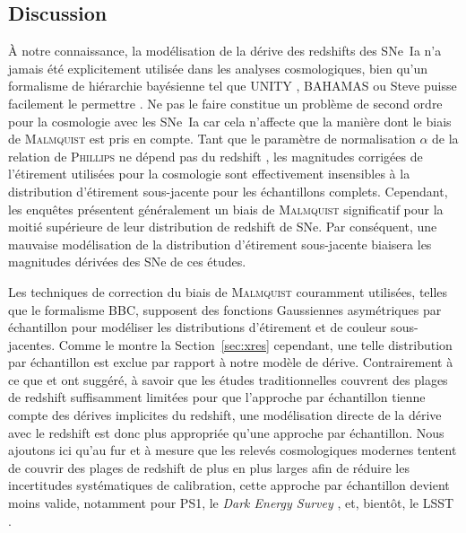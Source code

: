 \documentclass[../main/main.tex]{subfiles}
\begin{document}
\subsection{Discussion}\label{ssec:disc}

À notre connaissance, la modélisation de la dérive des redshifts des SNe~Ia n'a
jamais été explicitement utilisée dans les analyses cosmologiques, bien qu'un
formalisme de hiérarchie bayésienne tel que UNITY \citep{rubin2015}, BAHAMAS
\citep{shariff2016} ou Steve \citep{hinton2019} puisse facilement le permettre
\citep[voir, par exemple, les sections 1.3 et 2.5 de][]{rubin2015}. Ne pas le
faire constitue un problème de second ordre pour la cosmologie avec les SNe~Ia
car cela n'affecte que la manière dont le biais de \textsc{Malmquist} est pris
en compte. Tant que le paramètre de normalisation $\alpha$ de la relation de
\textsc{Phillips} \citep{phillips1993} ne dépend pas du redshift \citep[une
étude qui dépasse le cadre de cette thèse, mais voir, par
exemple][]{scolnic2018}, les magnitudes corrigées de l'étirement utilisées pour
la cosmologie sont effectivement insensibles à la distribution d'étirement
sous-jacente pour les échantillons complets. Cependant, les enquêtes présentent
généralement un biais de \textsc{Malmquist} significatif pour la moitié
supérieure de leur distribution de redshift de SNe. Par conséquent, une mauvaise
modélisation de la distribution d'étirement sous-jacente biaisera les magnitudes
dérivées des SNe de ces études.

Les techniques de correction du biais de \textsc{Malmquist} couramment
utilisées, telles que le formalisme BBC, supposent des fonctions Gaussiennes
asymétriques par échantillon pour modéliser les distributions d'étirement et de
couleur sous-jacentes. Comme le montre la Section~\ref{sec:xres} cependant, une
telle distribution par échantillon est exclue par rapport à notre modèle de
dérive. Contrairement à ce que \citep[Section 2]{scolnic2016} et \citep[Section
5.4]{scolnic2018} ont suggéré, à savoir que les études traditionnelles couvrent
des plages de redshift suffisamment limitées pour que l'approche par échantillon
tienne compte des dérives implicites du redshift, une modélisation directe de la
dérive avec le redshift est donc plus appropriée qu'une approche par
échantillon. Nous ajoutons ici qu'au fur et à mesure que les relevés
cosmologiques modernes tentent de couvrir des plages de redshift de plus en plus
larges afin de réduire les incertitudes systématiques de calibration, cette
approche par échantillon devient moins valide, notamment pour PS1, le
\textit{Dark Energy Survey} \citep[DES,][]{abbott2019}, et, bientôt, le LSST
\citep{ivezic2019}.
\end{document}
